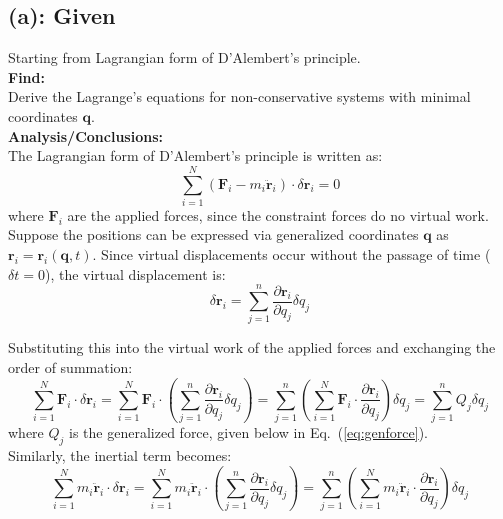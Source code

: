 \documentclass[titlepage]{article}
\begin{document}
\subsection*{(a): Given}
Starting from Lagrangian form of D'Alembert's principle.\\

\textbf{Find:}\\
Derive the Lagrange's equations for non-conservative systems with minimal coordinates $\boldsymbol{q}$.\\

\textbf{Analysis/Conclusions:}\\
The Lagrangian form of D'Alembert's principle is written as:
\begin{equation}
	\sum_{i=1}^{N}\left(\boldsymbol{F}_i-m_i\ddot{\boldsymbol{r}}_i\right)\cdot\delta\boldsymbol{r}_i=0
\end{equation}
where $\boldsymbol{F}_i$ are the applied forces, since the constraint forces do no virtual work. Suppose the positions can be expressed via generalized coordinates $\boldsymbol{q}$ as $\boldsymbol{r}_i=\boldsymbol{r}_i(\boldsymbol{q},t)$. Since virtual displacements occur without the passage of time ($\delta t=0$), the virtual displacement is:
\begin{equation}
	\delta\boldsymbol{r}_i=\sum_{j=1}^{n}\frac{\partial\boldsymbol{r}_i}{\partial q_j}\delta q_j
\end{equation}

Substituting this into the virtual work of the applied forces and exchanging the order of summation:
\begin{equation}
	\sum_{i=1}^{N}\boldsymbol{F}_i\cdot\delta\boldsymbol{r}_i=\sum_{i=1}^{N}\boldsymbol{F}_i\cdot\left(\sum_{j=1}^{n}\frac{\partial\boldsymbol{r}_i}{\partial q_j}\delta q_j\right)=\sum_{j=1}^{n}\left(\sum_{i=1}^{N}\boldsymbol{F}_i\cdot\frac{\partial\boldsymbol{r}_i}{\partial q_j}\right)\delta q_j=\sum_{j=1}^{n}Q_j\delta q_j
\end{equation}
where $Q_j$ is the generalized force, given below in Eq.~(\ref{eq:genforce}).\\

Similarly, the inertial term becomes:
\begin{equation}
	\sum_{i=1}^{N}m_i\ddot{\boldsymbol{r}}_i\cdot\delta\boldsymbol{r}_i=\sum_{i=1}^{N}m_i\ddot{\boldsymbol{r}}_i\cdot\left(\sum_{j=1}^{n}\frac{\partial\boldsymbol{r}_i}{\partial q_j}\delta q_j\right)=\sum_{j=1}^{n}\left(\sum_{i=1}^{N}m_i\ddot{\boldsymbol{r}}_i\cdot\frac{\partial\boldsymbol{r}_i}{\partial q_j}\right)\delta q_j
\end{equation}
\end{document}
